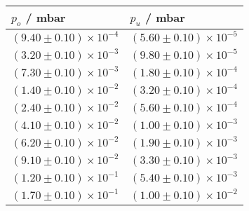 \begin{tabular}{ll}
\toprule
                                $p_o$ / mbar &                                 $p_u$ / mbar \\
\midrule
 $\left(9.40 \pm 0.10\right) \times 10^{-4}$ &  $\left(5.60 \pm 0.10\right) \times 10^{-5}$ \\
 $\left(3.20 \pm 0.10\right) \times 10^{-3}$ &  $\left(9.80 \pm 0.10\right) \times 10^{-5}$ \\
 $\left(7.30 \pm 0.10\right) \times 10^{-3}$ &  $\left(1.80 \pm 0.10\right) \times 10^{-4}$ \\
 $\left(1.40 \pm 0.10\right) \times 10^{-2}$ &  $\left(3.20 \pm 0.10\right) \times 10^{-4}$ \\
 $\left(2.40 \pm 0.10\right) \times 10^{-2}$ &  $\left(5.60 \pm 0.10\right) \times 10^{-4}$ \\
 $\left(4.10 \pm 0.10\right) \times 10^{-2}$ &  $\left(1.00 \pm 0.10\right) \times 10^{-3}$ \\
 $\left(6.20 \pm 0.10\right) \times 10^{-2}$ &  $\left(1.90 \pm 0.10\right) \times 10^{-3}$ \\
 $\left(9.10 \pm 0.10\right) \times 10^{-2}$ &  $\left(3.30 \pm 0.10\right) \times 10^{-3}$ \\
 $\left(1.20 \pm 0.10\right) \times 10^{-1}$ &  $\left(5.40 \pm 0.10\right) \times 10^{-3}$ \\
 $\left(1.70 \pm 0.10\right) \times 10^{-1}$ &  $\left(1.00 \pm 0.10\right) \times 10^{-2}$ \\
\bottomrule
\end{tabular}
